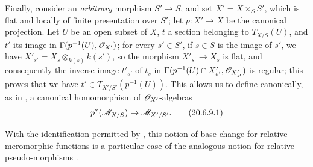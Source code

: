 \begin{env}[20.6.9]
\label{IV.20.6.9}
Finally, consider an \emph{arbitrary} morphism $S'\to S$, and set $X'=X\times_S S'$, which is flat and locally of finite presentation over $S'$; let $p:X'\to X$ be the canonical projection.
Let $U$ be an open subset of $X$, $t$ a section belonging to $T_{X/S}(U)$, and $t'$ its image in $\Gamma(p^{-1}(U),\mathscr{O}_{X'})$; for every $s'\in S'$, if $s\in S$ is the image of $s'$, we have $X'_{s'}=X_s\otimes_{k(s)}k(s')$, so the morphism $X'_{s'}\to X_s$ is flat, and consequently  the inverse image $t'_{s'}$ of $t_s$ in $\Gamma(p^{-1}(U)\cap X'_{s'},\mathscr{O}_{X'_{s'}})$ is regular; this proves that we have $t'\in T_{X'/S'}(p^{-1}(U))$.
This allows us to define canonically, as in , a canonical homomorphism of $\mathscr{O}_{X'}$-algebras
\[
\label{IV.20.6.9.1}
  p^*(\mathscr{M}_{X/S})\to\mathscr{M}_{X'/S'}.
  \tag{20.6.9.1}
\]

With the identification permitted by , this notion of base change for relative meromorphic functions is a particular case of the analogous notion for relative pseudo-morphisms .
\end{env}
